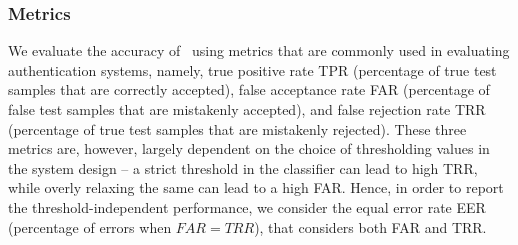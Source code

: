 \subsubsection{Metrics}
We evaluate the accuracy of \systemname~using metrics that are commonly used
in evaluating authentication systems, namely,
true positive rate TPR (percentage of true test samples that are
correctly accepted), false acceptance rate FAR (percentage of false test samples that are
mistakenly accepted), and false rejection rate TRR (percentage of true test
samples that are mistakenly rejected). These three metrics are, however, largely dependent on the choice of thresholding values in the system design --
a strict threshold in the classifier can lead to high TRR, while
overly relaxing the same can lead to a high FAR. Hence, in order to report the threshold-independent performance, we consider
the equal error rate EER (percentage of errors when $FAR = TRR$), that
considers both FAR and TRR. 



